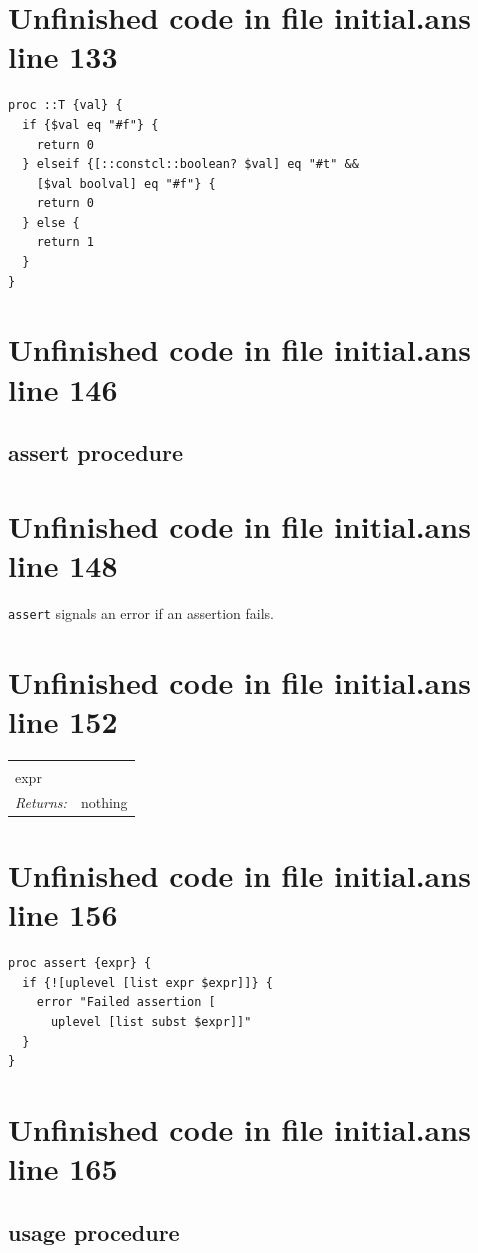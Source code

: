\documentclass[twoside,9pt]{report}
\begin{document}
\section{Unfinished code in file initial.ans line 133}
\begin{lstlisting}
proc ::T {val} {
  if {$val eq "#f"} {
    return 0
  } elseif {[::constcl::boolean? $val] eq "#t" &&
    [$val boolval] eq "#f"} {
    return 0
  } else {
    return 1
  }
}
\end{lstlisting}
\section{Unfinished code in file initial.ans line 146}
\subsection{assert procedure}
\label{assert-procedure}
\section{Unfinished code in file initial.ans line 148}


\texttt{assert} signals an error if an assertion fails.

\section{Unfinished code in file initial.ans line 152}
\noindent\begin{tabular}{ |p{1.9cm} p{8cm}| }
\hline
\rowcolor[HTML]{CCCCCC} \multicolumn{2}{|l|}{\bf assert (internal)} \\
expr &  \\
\textit{Returns:} & nothing \\
\hline
\end{tabular}
\section{Unfinished code in file initial.ans line 156}
\begin{lstlisting}
proc assert {expr} {
  if {![uplevel [list expr $expr]]} {
    error "Failed assertion [
      uplevel [list subst $expr]]"
  }
}
\end{lstlisting}
\section{Unfinished code in file initial.ans line 165}
\subsection{usage procedure}
\label{usage-procedure}
\end{document}
